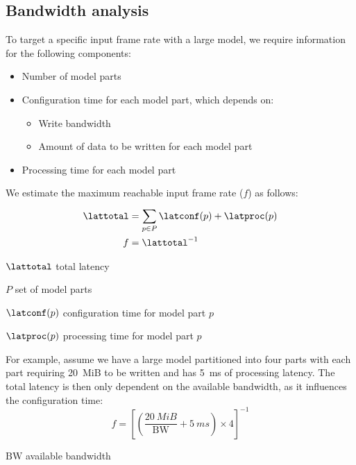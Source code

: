\subsection{Bandwidth analysis}
To target a specific input frame rate with a large model, we require information for the following components:
\begin{itemize}
    \item Number of model parts
    \item Configuration time for each model part, which depends on:
    \begin{itemize}
        \item Write bandwidth
        \item Amount of data to be written for each model part
    \end{itemize}
    \item Processing time for each model part
\end{itemize}

We estimate the maximum reachable input frame rate ($f$) as follows:
\begin{align*} 
    \lattotal &= \sum_{p \in P}^{}{\latconf(p) + \latproc(p)} \\
    f &= \lattotal^{-1}
\end{align*}

\begin{eqexpl}[15mm]
    \item{$\lattotal$} total latency
    \item{$P$} set of model parts
    \item{$\latconf(p)$} configuration time for model part $p$
    \item{$\latproc(p)$} processing time for model part $p$
\end{eqexpl}

For example, assume we have a large model partitioned into four parts with each part requiring \SI{20}{MiB} to be written and has \SI{5}{ms} of processing latency.
The total latency is then only dependent on the available bandwidth, as it influences the configuration time:
\begin{equation*}
    f = \left[ \left( \frac{\SI{20}{MiB}}{\textrm{BW}} + \SI{5}{ms} \right) \times 4 \right]^{-1}
\end{equation*}

\begin{eqexpl}[15mm]
    \item{$\textrm{BW}$} available bandwidth
\end{eqexpl}

